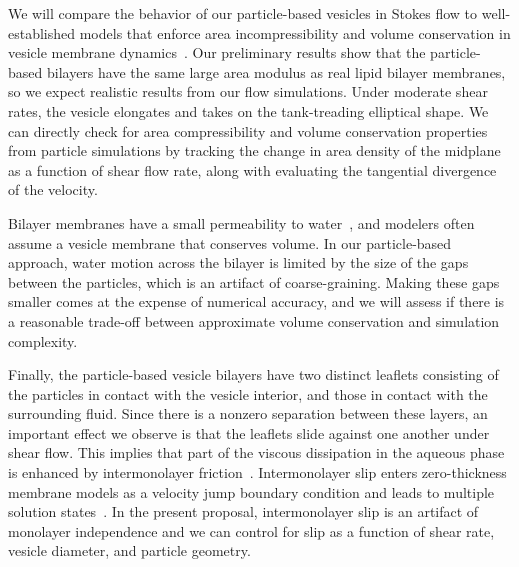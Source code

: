 We will compare the behavior of our particle-based vesicles in Stokes
flow to well-established models that enforce area incompressibility and
volume conservation in vesicle membrane
dynamics~\cite{torres-sanchez_millan_arroyo_2019,
mahapatra_saintillan_rangamani_2020, Steigmann99, C6SM02452A}. Our
preliminary results show that the particle-based bilayers have the same
large area modulus as real lipid bilayer membranes, so we expect
realistic results from our flow simulations. Under moderate shear rates,
the vesicle elongates and takes on the tank-treading elliptical shape.
We can directly check for area compressibility and volume conservation
properties from particle simulations by tracking the change in area
density of the midplane as a function of shear flow rate, along with
evaluating the tangential divergence of the velocity.

Bilayer membranes have a small permeability to
water~\cite{323e9a2f0c58487ea82518d7a1f96485}, and modelers often assume
a vesicle membrane that conserves volume. In our particle-based
approach, water motion across the bilayer is limited by the size of the
gaps between the particles, which is an artifact of coarse-graining.
Making these gaps smaller comes at the expense of numerical accuracy,
and we will assess if there is a reasonable trade-off between
approximate volume conservation and simulation complexity. 

Finally, the particle-based vesicle bilayers have two distinct leaflets
consisting of the particles in contact with the vesicle interior, and
those in contact with the surrounding fluid. Since there is a nonzero
separation between these layers, an important effect we observe is that
the leaflets slide against one another under shear flow. This implies
that part of the viscous dissipation in the aqueous phase is enhanced by
intermonolayer friction~\cite{SHKULIPA2005823, ShkulipaThesis}.
Intermonolayer slip enters zero-thickness membrane models as a velocity
jump boundary condition and leads to multiple solution
states~\cite{schwalbe_vlahovska_miksis_2010}. In the present proposal,
intermonolayer slip is an artifact of monolayer independence and we can
control for slip as a function of shear rate, vesicle diameter, and
particle geometry.

